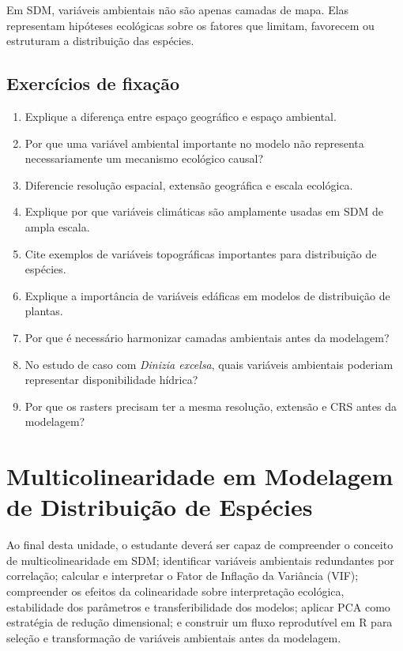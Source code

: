 \documentclass{ueap-sdm}
\begin{document}
\begin{conceito}[title={\faBook\quad Mensagem central}]
	Em SDM, variáveis ambientais não são apenas camadas de mapa. Elas representam hipóteses ecológicas sobre os fatores que limitam, favorecem ou estruturam a distribuição das espécies.
\end{conceito}

\section{Exercícios de fixação}

\begin{enumerate}
	\item Explique a diferença entre espaço geográfico e espaço ambiental.
	\item Por que uma variável ambiental importante no modelo não representa necessariamente um mecanismo ecológico causal?
	\item Diferencie resolução espacial, extensão geográfica e escala ecológica.
	\item Explique por que variáveis climáticas são amplamente usadas em SDM de ampla escala.
	\item Cite exemplos de variáveis topográficas importantes para distribuição de espécies.
	\item Explique a importância de variáveis edáficas em modelos de distribuição de plantas.
	\item Por que é necessário harmonizar camadas ambientais antes da modelagem?
	\item No estudo de caso com \textit{Dinizia excelsa}, quais variáveis ambientais poderiam representar disponibilidade hídrica?
	\item Por que os rasters precisam ter a mesma resolução, extensão e CRS antes da modelagem?
\end{enumerate}


\chapter[Multicolinearidade]{Multicolinearidade em Modelagem de Distribuição de Espécies}

\begin{objetivos}
	Ao final desta unidade, o estudante deverá ser capaz de compreender o conceito de multicolinearidade em SDM; identificar variáveis ambientais redundantes por correlação; calcular e interpretar o Fator de Inflação da Variância (VIF); compreender os efeitos da colinearidade sobre interpretação ecológica, estabilidade dos parâmetros e transferibilidade dos modelos; aplicar PCA como estratégia de redução dimensional; e construir um fluxo reprodutível em R para seleção e transformação de variáveis ambientais antes da modelagem.
\end{objetivos}
\end{document}
